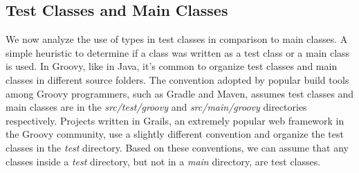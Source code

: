 \documentclass[preprint]{sigplanconf}
\begin{document}
\subsection{Test Classes and Main Classes\label{res-test-scripts}}
We now analyze the use of types in test classes in comparison to main classes.
A simple heuristic to determine if a class was written as a test class or a main class is used.
In Groovy, like in Java, it's common to organize test classes and main classes in different source folders.
The convention adopted by popular build tools among Groovy programmers, such as Gradle and Maven, assumes test classes and main classes are in the \emph{src/test/groovy} and \emph{src/main/groovy} directories respectively.
Projects written in Grails, an extremely popular web framework in the Groovy community, use a slightly different convention and organize the test classes in the \emph{test} directory.
Based on these conventions, we can assume that any classes inside a \emph{test} directory, but not in a \emph{main} directory, are test classes.
\end{document}
